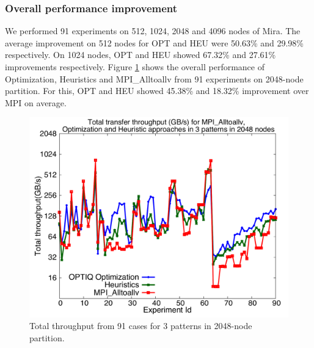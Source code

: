 \subsubsection{Overall performance improvement}

We performed 91 experiments on 512, 1024, 2048 and 4096 nodes of Mira. The average improvement on 512 nodes for OPT and HEU were 50.63\% and 29.98\% respectively. On 1024 nodes, OPT and HEU showed 67.32\% and 27.61\% improvements respectively. 
Figure \ref{fig:alltests_1k} shows the overall performance of Optimization, Heuristics and MPI\_Alltoallv from 91 experiments on 2048-node partition. For this, OPT and HEU showed 45.38\% and 18.32\% improvement over MPI on average.
\begin{figure}[!htb]
\vspace{-0.15in}
\centering
\includegraphics[scale=0.27]{figures/alltests_1k.pdf}
\vspace{-0.15in}
\caption{\small Total throughput from 91 cases for 3 patterns in 2048-node partition.}
\vspace{-0.15in}
\label{fig:alltests_1k}
\end{figure}
